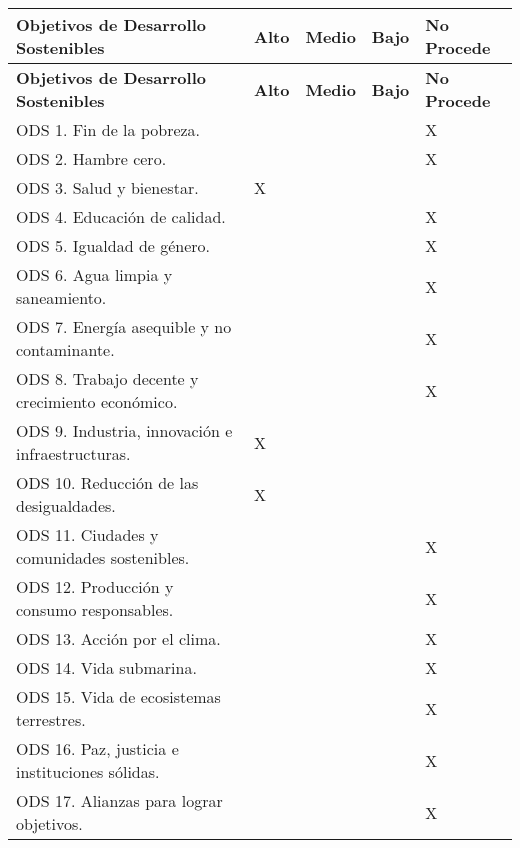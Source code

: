 \begin{longtable}{|p{8cm}|p{1.5cm}|p{1.5cm}|p{1.5cm}|p{1.5cm}|}
\hline
\textbf{Objetivos de Desarrollo Sostenibles} & \textbf{Alto} & \textbf{Medio} & \textbf{Bajo} & \textbf{No Procede} \\
\hline
\endfirsthead

\hline
\textbf{Objetivos de Desarrollo Sostenibles} & \textbf{Alto} & \textbf{Medio} & \textbf{Bajo} & \textbf{No Procede} \\
\hline
\endhead

\hline
\endfoot

\hline
\endlastfoot

ODS 1. Fin de la pobreza. & & & & X \\
\hline

ODS 2. Hambre cero. & & & & X \\
\hline

ODS 3. Salud y bienestar. & X & & & \\
\hline

ODS 4. Educación de calidad. & & & & X \\
\hline

ODS 5. Igualdad de género. & & & & X \\
\hline

ODS 6. Agua limpia y saneamiento. & & & & X \\
\hline

ODS 7. Energía asequible y no contaminante. & & & & X \\
\hline

ODS 8. Trabajo decente y crecimiento económico. & & & & X \\
\hline

ODS 9. Industria, innovación e infraestructuras. & X & & & \\
\hline

ODS 10. Reducción de las desigualdades. & X & & & \\
\hline

ODS 11. Ciudades y comunidades sostenibles. & & & & X \\
\hline

ODS 12. Producción y consumo responsables. & & & & X \\
\hline

ODS 13. Acción por el clima. & & & & X \\
\hline

ODS 14. Vida submarina. & & & & X \\
\hline

ODS 15. Vida de ecosistemas terrestres. & & & & X \\
\hline

ODS 16. Paz, justicia e instituciones sólidas. & & & & X \\
\hline

ODS 17. Alianzas para lograr objetivos. & & & & X \\
\hline

\end{longtable}

